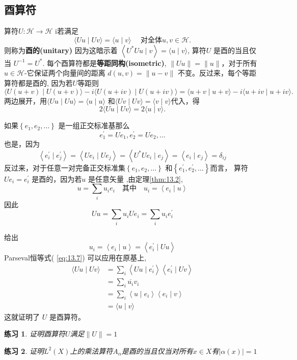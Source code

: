 \documentclass[hyperref,UTF8]{ctexbook}
\newtheorem*{exercise}{练习}
\begin{document}
\subsection{酉算符}
算符$U: \mathcal{H} \rightarrow \mathcal{H}$ i若满足
$$
\langle U u \mid U v\rangle=\langle u \mid v\rangle \quad \text { 对全体} u, v \in \mathcal{H} .
$$
则称为\textbf{酉的(unitary)}
因为这暗示着 $\left\langle U^{*} U u \mid v\right\rangle=\langle u \mid v\rangle$, 算符$U$ 是酉的当且仅当 $U^{-1}=U^{*}$. 每个酉算符都是\textbf{等距同构(isometric)}, $\|U u\|=\|u\|$，对于所有 $u \in \mathcal{H}$-它保证两个向量间的距离 $d(u, v)=\|u-v\|$ 不变。反过来，每个等距算符都是酉的, 因为若$U$等距则
$$
\langle U(u+v) \mid U(u+v)\rangle-i\langle U(u+i v) \mid U(u+i v)\rangle=\langle u+v \mid u+v\rangle-i\langle u+i v \mid u+i v\rangle .
$$
两边展开，用$\langle U u \mid U u\rangle=\langle u \mid u\rangle$ 和$\langle U v \mid U v\rangle=\langle v \mid v\rangle$代入，得
$$
2\langle U u \mid U v\rangle=2\langle u \mid v\rangle .
$$

如果$\left\{e_{1}, e_{2}, \ldots\right\}$ 是一组正交标准基那么
$$
e_{1}^{\prime}=U e_{1}, e_{2}^{\prime}=U e_{2}, \ldots
$$
也是，因为
$$
\left\langle e_{i}^{\prime} \mid e_{j}^{\prime}\right\rangle=\left\langle U e_{i} \mid U e_{j}\right\rangle=\left\langle U^{*} U e_{i} \mid e_{j}\right\rangle=\left\langle e_{i} \mid e_{j}\right\rangle=\delta_{i j}
$$
反过来，对于任意一对完备正交标准集$\left\{e_{1}, e_{2}, \ldots\right\}$ 和$\left\{e_{1}^{\prime}, e_{2}^{\prime}, \ldots\right\}$而言， 算符 $U e_{i}=e_{i}^{\prime}$ 是酉的，因为若$u$ 是任意矢量 ,由定理\ref{thm:13.2},
$$
u=\sum_{i} u_{i} e_{i} \quad \text {其中} \quad u_{i}=\left\langle e_{i} \mid u\right\rangle
$$
因此
$$
U u=\sum_{i} u_{i} U e_{i}=\sum_{i} u_{i} e_{i}^{\prime}
$$

给出
$$
u_{i}=\left\langle e_{i} \mid u\right\rangle=\left\langle e_{i}^{\prime} \mid U u\right\rangle
$$
Parseval恒等式( \ref{eq:13.7}) 可以应用在原基上,
$$
\begin{aligned}
\langle U u \mid U v\rangle &=\sum_{i}\left\langle U u \mid e_{i}^{\prime}\right\rangle\left\langle e_{i}^{\prime} \mid U v\right\rangle \\
&=\sum_{i} \overline{u_{i}} v_{i} \\
&=\sum_{i}\left\langle u \mid e_{i}\right\rangle\left\langle e_{i} \mid v\right\rangle \\
&=\langle u \mid v\rangle
\end{aligned}
$$
这就证明了 $U$ 是酉算符。
\begin{exercise}
    证明酉算符\(U\)满足\(\|U\|=1\)
\end{exercise}
\begin{exercise}
    证明\(L^2(X)\)上的乘法算符\(A_\alpha\)是酉的当且仅当对所有\(x\in X \)有\(|\alpha(x)|=1\)
\end{exercise}
\end{document}
